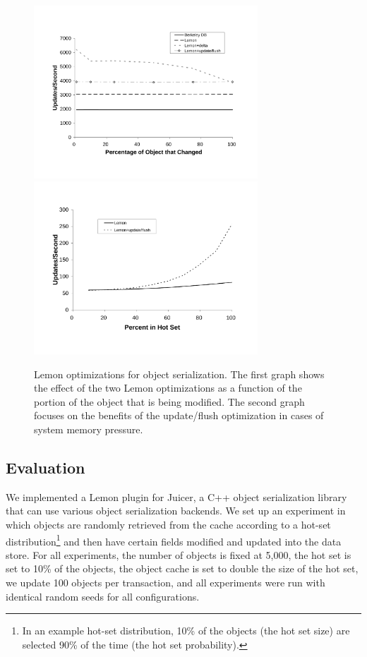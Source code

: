 \documentclass[10pt,letterpaper,twocolumn,english]{article}
\newcommand{\yad}{Lemon\xspace}
\newcommand{\oasys}{Juicer\xspace}
\begin{document}
\begin{figure}[t!]
\includegraphics[width=3.3in]{object-diff.pdf}
\hspace{.3in}
\includegraphics[width=3.3in]{mem-pressure.pdf}
\caption{\sf \label{fig:OASYS}
\yad optimizations for object
serialization. The first graph shows the effect of the two \yad
optimizations as a function of the portion of the object that is being
modified. The second graph focuses on the 
benefits of the update/flush optimization in cases of system
memory pressure.}
\end{figure}

\subsection{Evaluation}

We implemented a \yad plugin for \oasys, a C++ object serialization
library that can use various object serialization backends. 
We set up an experiment in which objects are randomly
retrieved from the cache according to a hot-set distribution\footnote{In
an example hot-set distribution, 10\% of the objects (the hot set size) are
selected 90\% of the time (the hot set probability).} 
and then have certain fields modified and
updated into the data store. For all experiments, the number of objects
is fixed at 5,000, the
hot set is set to 10\% of the objects, the object cache is set to
double the size of the hot set, we update 100 objects per
transaction, and all experiments were run with identical random seeds 
for all configurations.
\end{document}
